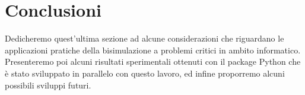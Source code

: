 \section{Conclusioni}
\label{sec:conclusions}

Dedicheremo quest'ultima sezione ad alcune considerazioni che riguardano le applicazioni pratiche della bisimulazione a problemi critici in ambito informatico. Presenteremo poi alcuni risultati sperimentali ottenuti con il package Python che è stato sviluppato in parallelo con questo lavoro, ed infine proporremo alcuni possibili sviluppi futuri.



